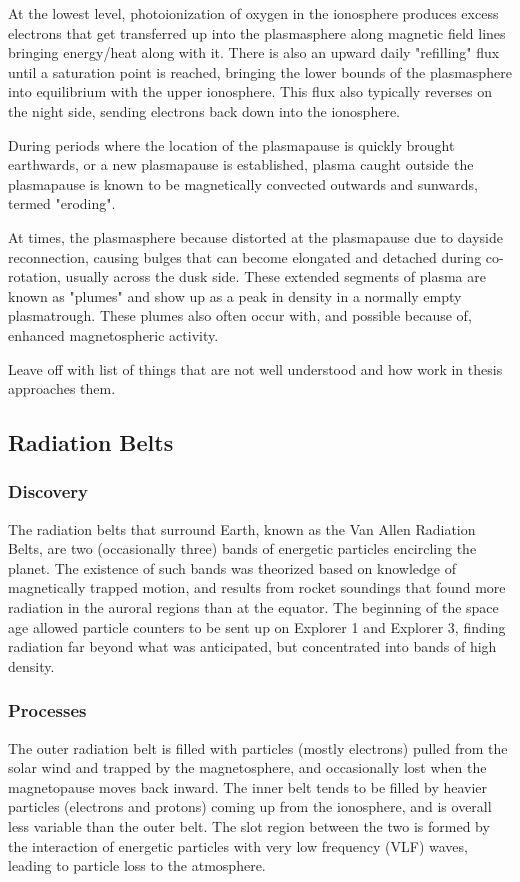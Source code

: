 At the lowest level, photoionization of oxygen in the ionosphere produces excess electrons that get transferred up into the plasmasphere along magnetic field lines bringing energy/heat along with it. There is also an upward daily "refilling" flux until a saturation point is reached, bringing the lower bounds of the plasmasphere into equilibrium with the upper ionosphere. This flux also typically reverses on the night side, sending electrons back down into the ionosphere.

During periods where the location of the plasmapause is quickly brought earthwards, or a new plasmapause is established, plasma caught outside the plasmapause is known to be magnetically convected outwards and sunwards\cite{ErosionRecoveryPlasmasphere}, termed "eroding". 

At times, the plasmasphere because distorted at the plasmapause due to dayside reconnection, causing bulges that can become elongated and detached during co-rotation, usually across the dusk side. These extended segments of plasma are known as "plumes" and show up as a peak in density in a normally empty plasmatrough. These plumes also often occur with, and possible because of, enhanced magnetospheric activity\cite{EvolutionPlasmasphericIons}.


\note Leave off with list of things that are not well understood and how work in thesis approaches them.

\subsection{Radiation Belts}

\subsubsection{Discovery}
The radiation belts that surround Earth, known as the Van Allen Radiation Belts, are two (occasionally three\cite{LinksBetweenPlasmapauseRadiationBelt}) bands of energetic particles encircling the planet. The existence of such bands was theorized based on knowledge of magnetically trapped motion, and results from rocket soundings that found more radiation in the auroral regions than at the equator.  The beginning of the space age allowed particle counters to be sent up on Explorer 1 and Explorer 3, finding radiation far beyond what was anticipated, but concentrated into bands of high density\cite{MagnetoHistory}.

\subsubsection{Processes}
The outer radiation belt is filled with particles (mostly electrons) pulled from the solar wind and trapped by the magnetosphere, and occasionally lost when the magnetopause moves back inward. The inner belt tends to be filled by heavier particles (electrons and protons) coming up from the ionosphere, and is overall less variable than the outer belt\cite{LinksBetweenPlasmapauseRadiationBelt}. The slot region between the two is formed by the interaction of energetic particles with very low frequency (VLF) waves, leading to particle loss to the atmosphere\cite{LongTermVariationsSlotRegion}.

